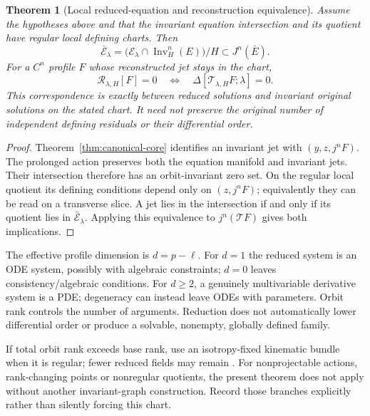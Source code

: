 \documentclass[11pt]{article}
\newtheorem{theorem}{Theorem}[section]
\theoremstyle{definition}
\begin{document}
\begin{theorem}[Local reduced-equation and reconstruction equivalence]
\label{thm:reconstruction-core}
Assume the hypotheses above and that the invariant equation intersection and
its quotient have regular local defining charts. Then
\begin{equation}
 \bar{\mathcal E}_\lambda
   =\bigl(\mathcal E_\lambda\cap\operatorname{Inv}_H^n(E)\bigr)/H
       \subset J^n(\bar E).
 \label{eq:fundamental-pullback}
\end{equation}
For a $C^n$ profile $F$ whose reconstructed jet stays in the chart,
\begin{equation}
 \mathcal R_{\lambda,H}[F]=0
 \quad\Longleftrightarrow\quad
 \Delta[\mathcal T_{\lambda,H}F;\lambda]=0.
 \label{eq:reconstruction-equivalence}
\end{equation}
This correspondence is exactly between reduced solutions and invariant
original solutions on the stated chart. It need not preserve the original
number of independent defining residuals or their differential order.
\end{theorem}
\begin{proof}
Theorem~\ref{thm:canonical-core} identifies an invariant jet with
$(y,z,j^nF)$. The prolonged action preserves both the equation manifold and
invariant jets. Their intersection therefore has an orbit-invariant zero set.
On the regular local quotient its defining conditions depend only on
$(z,j^nF)$; equivalently they can be read on a transverse slice. A jet lies in
the intersection if and only if its quotient lies in $\bar{\mathcal E}_\lambda$.
Applying this equivalence to $j^n(\mathcal TF)$ gives both implications.
\end{proof}

The effective profile dimension is $d=p-\ell$. For $d=1$ the reduced system
is an ODE system, possibly with algebraic constraints; $d=0$ leaves
consistency/algebraic conditions. For $d\ge2$, a genuinely multivariable
derivative system is a PDE; degeneracy can instead leave ODEs with parameters.
Orbit rank controls the number of arguments. Reduction does not automatically
lower differential order or produce a solvable, nonempty, globally defined family.

If total orbit rank exceeds base rank, use an isotropy-fixed kinematic bundle
when it is regular; fewer reduced fields may remain \cite{anderson2000}.
For nonprojectable actions, rank-changing points or nonregular quotients,
the present theorem does not apply without another invariant-graph construction.
Record those branches explicitly rather than silently forcing this chart.
\end{document}
